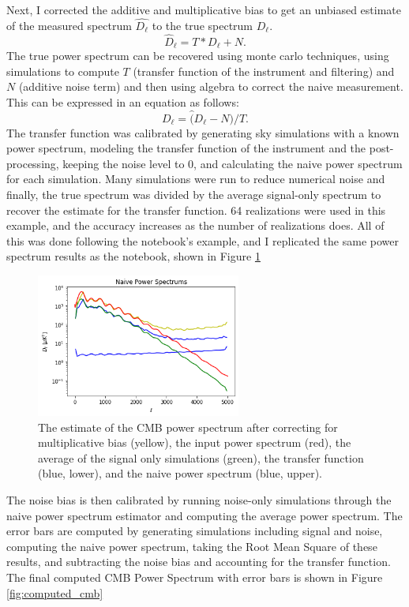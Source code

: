 \documentclass[12pt]{article}
\begin{document}
Next, I corrected the additive and multiplicative bias to get an unbiased estimate of the measured spectrum $\hat{D_\ell}$ to the true spectrum $D_\ell$.
$$\hat D_\ell = T*D_\ell + N. $$
The true power spectrum can be recovered using monte carlo techniques, using simulations to compute $T$ (transfer function of the instrument and filtering) and $N$ (additive noise term) and then using algebra to correct the naive measurement. This can be expressed in an equation as follows:
$$ D_\ell = \hat (D_\ell - N)/T. $$
The transfer function was calibrated by generating sky simulations with a known power spectrum, modeling the transfer function of the instrument and the post-processing, keeping the noise level to 0, and calculating the naive power spectrum for each simulation. Many simulations were run to reduce numerical noise and finally, the true spectrum was divided by the average signal-only spectrum to recover the estimate for the transfer function. 64 realizations were used in this example, and the accuracy increases as the number of realizations does. All of this was done following the notebook's example, and I replicated the same power spectrum results as the notebook, shown in Figure \ref{fig:naive_spectrums}

\begin{figure}[H]
    \centering
    \includegraphics[width=0.6\textwidth]{images/naive spectrums.png}
    \caption{The estimate of the CMB power spectrum after correcting for multiplicative bias (yellow), the input power spectrum (red), the average of the signal only simulations (green), the transfer function (blue, lower), and the naive power spectrum (blue, upper).}
    \label{fig:naive_spectrums}
\end{figure}

The noise bias is then calibrated by running noise-only simulations through the naive power spectrum estimator and computing the average power spectrum. The error bars are computed by generating simulations including signal and noise, computing the naive power spectrum, taking the Root Mean Square of these results, and subtracting the noise bias and accounting for the transfer function. The final computed CMB Power Spectrum with error bars is shown in Figure \ref{fig:computed_cmb}
\end{document}
